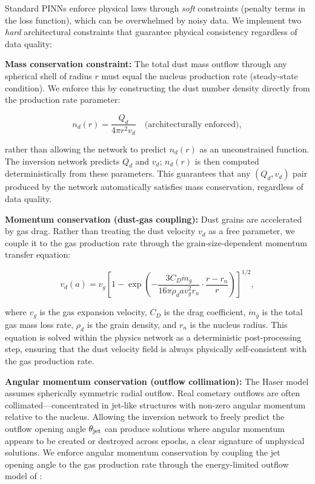 \documentclass[usenatbib]{mnras}
\begin{document}
Standard PINNs enforce physical laws through \textit{soft} constraints (penalty terms in the loss function), which can be overwhelmed by noisy data. We implement two \textit{hard} architectural constraints that guarantee physical consistency regardless of data quality:

\textbf{Mass conservation constraint:} The total dust mass outflow through any spherical shell of radius $r$ must equal the nucleus production rate (steady-state condition). We enforce this by constructing the dust number density directly from the production rate parameter:

\begin{equation}\label{eq:hard_mass}
n_d(r) = \frac{Q_d}{4\pi r^2 v_d} \quad \text{(architecturally enforced)},
\end{equation}

rather than allowing the network to predict $n_d(r)$ as an unconstrained function. The inversion network predicts $Q_d$ and $v_d$; $n_d(r)$ is then computed deterministically from these parameters. This guarantees that any $(Q_d, v_d)$ pair produced by the network automatically satisfies mass conservation, regardless of data quality.

\textbf{Momentum conservation (dust-gas coupling):} Dust grains are accelerated by gas drag. Rather than treating the dust velocity $v_d$ as a free parameter, we couple it to the gas production rate through the grain-size-dependent momentum transfer equation:

\begin{equation}\label{eq:hard_momentum}
v_d(a) = v_g \left[1 - \exp\left(-\frac{3 C_D \dot{m}_g}{16 \pi \rho_d a v_g^2 r_n} \cdot \frac{r - r_n}{r}\right)\right]^{1/2},
\end{equation}

where $v_g$ is the gas expansion velocity, $C_D$ is the drag coefficient, $\dot{m}_g$ is the total gas mass loss rate, $\rho_d$ is the grain density, and $r_n$ is the nucleus radius. This equation is solved within the physics network as a deterministic post-processing step, ensuring that the dust velocity field is always physically self-consistent with the gas production rate.

\textbf{Angular momentum conservation (outflow collimation):} The Haser model assumes spherically symmetric radial outflow. Real cometary outflows are often collimated---concentrated in jet-like structures with non-zero angular momentum relative to the nucleus. Allowing the inversion network to freely predict the outflow opening angle $\theta_{\rm jet}$ can produce solutions where angular momentum appears to be created or destroyed across epochs, a clear signature of unphysical solutions. We enforce angular momentum conservation by coupling the jet opening angle to the gas production rate through the energy-limited outflow model of \citet{belton07}:
\end{document}
